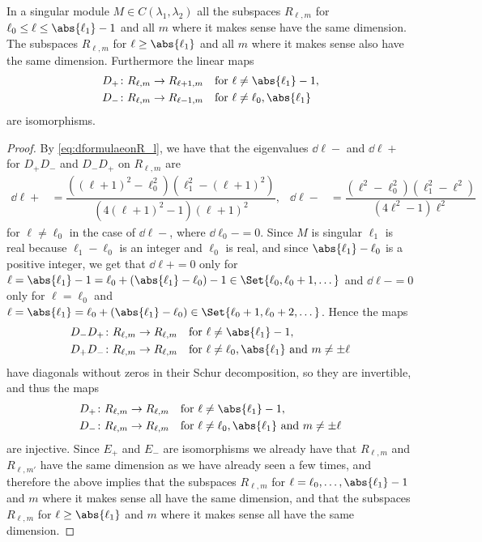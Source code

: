 \begin{lemma}
  In a singular module $M\in C(\lambda_1,\lambda_2)$ all the subspaces $R_{\ell,m}$ for $\ell_0\leq \ell\leq \abs{\ell_1}-1$ and all $m$ where it makes sense have the same dimension. The subspaces $R_{\ell,m}$ for $\ell\geq \abs{\ell_1}$ and all $m$ where it makes sense also have the same dimension. Furthermore the linear maps
  \begin{align*}
    D_+&\colon R_{\ell,m}\to R_{\ell+1,m} && \text{for }\ell\neq \abs{\ell_1}-1,\\
    D_-&\colon R_{\ell,m}\to R_{\ell-1,m} && \text{for }\ell\neq\ell_0,\abs{\ell_1}
  \end{align*}
  are isomorphisms.
\end{lemma}
\begin{proof}
  By \cref{eq:dformulaeonR_l}, we have that the eigenvalues $\dd{\ell}{-}$ and $\dd{\ell}{+}$ for $D_+D_-$ and $D_-D_+$ on $R_{\ell,m}$ are 
  \begin{align*}
    \dd{\ell}{+} &= \dfrac{((\ell+1)^2-\ell_0^2)(\ell_1^2-(\ell+1)^2)}{(4(\ell+1)^2-1)(\ell+1)^2}, & \dd{\ell}{-} &= \dfrac{(\ell^2-\ell_0^2)(\ell_1^2-\ell^2)}{(4\ell^2-1)\ell^2}
  \end{align*}
  for $\ell\neq \ell_0$ in the case of $\dd{\ell}{-}$, where $\dd{\ell_0}{-}=0$. Since $M$ is singular $\ell_1$ is real because $\ell_1-\ell_0$ is an integer and $\ell_0$ is real, and since $\abs{\ell_1}-\ell_0$ is a positive integer,  we get that $\dd{\ell}{+}=0$ only for $\ell=\abs{\ell_1}-1=\ell_0+(\abs{\ell_1}-\ell_0)-1\in \Set{\ell_0,\ell_0+1,\dotsc}$ and $\dd{\ell}{-}=0$ only for $\ell=\ell_0$ and $\ell=\abs{\ell_1}=\ell_0+(\abs{\ell_1}-\ell_0)\in \Set{\ell_0+1,\ell_0+2,\dotsc}$. Hence the maps
  \begin{align*}
    D_-D_+&\colon R_{\ell,m}\to R_{\ell,m} && \text{for }\ell\neq \abs{\ell_1}-1,\\
    D_+D_-&\colon R_{\ell,m}\to R_{\ell,m} && \text{for }\ell\neq \ell_0,\abs{\ell_1} \text{ and }m\neq \pm \ell
  \end{align*}
  have diagonals without zeros in their Schur decomposition, so they are invertible, and thus the maps
  \begin{align*}
    D_+&\colon R_{\ell,m}\to R_{\ell,m} && \text{for }\ell\neq \abs{\ell_1}-1,\\
    D_-&\colon R_{\ell,m}\to R_{\ell,m} && \text{for }\ell\neq \ell_0,\abs{\ell_1} \text{ and }m\neq \pm \ell
  \end{align*}
  are injective. Since $E_+$ and $E_-$ are isomorphisms we already have that $R_{\ell,m}$ and $R_{\ell,m'}$ have the same dimension as we have already seen a few times, and therefore the above implies that the subspaces $R_{\ell,m}$ for $\ell=\ell_0,\dotsc,\abs{\ell_1}-1$ and $m$ where it makes sense all have the same dimension, and that the subspaces $R_{\ell,m}$ for $\ell\geq \abs{\ell_1}$ and $m$ where it makes sense all have the same dimension.
\end{proof}

